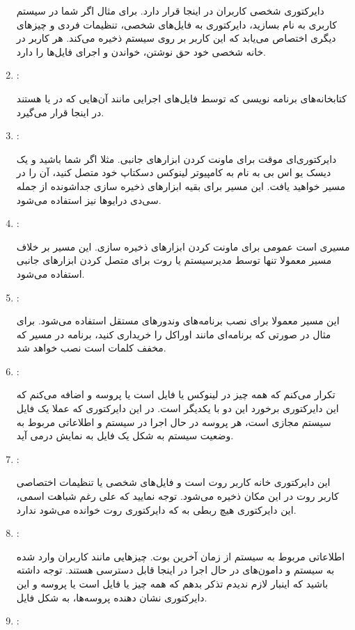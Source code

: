 \begin{enumerate}
دایرکتوری شخصی کاربران در اینجا قرار دارد. برای مثال اگر شما در سیستم کاربری به نام 
 بسازید، دایرکتوری 
 به فایل‌های شخصی، تنظیمات فردی و چیزهای دیگری اختصاص می‌یابد که این کاربر بر روی سیستم ذخیره می‌کند. هر کاربر در خانه شخصی خود حق نوشتن، خواندن و اجرای فایل‌ها را دارد.
\item {\large{}}:

کتابخانه‌های برنامه نویسی که توسط فایل‌های اجرایی مانند آن‌هایی که در 
 یا 
 هستند در اینجا قرار می‌گیرد.
\item {\large{}}:

دایرکتوری‌ای موقت برای ماونت کردن ابزارهای جانبی. مثلا اگر شما 
 باشید و یک دیسک یو اس بی به نام 
 به کامپیوتر لینوکس دسکتاپ خود متصل کنید، آن را در مسیر 
 خواهید یافت. این مسیر برای بقیه ابزارهای ذخیره سازی جداشونده از جمله سی‌دی درایوها نیز استفاده می‌شود.
\item {\large{}}:

مسیری است عمومی برای ماونت کردن ابزارهای ذخیره سازی. این مسیر بر خلاف مسیر 
 معمولا تنها توسط مدیرسیستم یا روت برای متصل کردن ابزارهای جانبی استفاده می‌شود.
\item {\large{}}:

این مسیر معمولا برای نصب برنامه‌های وندورهای مستقل استفاده می‌شود. برای مثال در صورتی که برنامه‌ای مانند اوراکل را خریداری کنید، برنامه در مسیر 
 که مخفف کلمات 
 است نصب خواهد شد.
\item {\large{}}:

تکرار می‌کنم که همه چیز در لینوکس یا فایل است یا پروسه و اضافه می‌کنم که این دایرکتوری برخورد این دو با یکدیگر است. در این دایرکتوری که عملا یک فایل سیستم مجازی است، هر پروسه در حال اجرا در سیستم و اطلاعاتی مربوط به وضعیت سیستم به شکل یک فایل به نمایش درمی آید.
\item {\large{}}:

این دایرکتوری خانه کاربر روت است و فایل‌های شخصی یا تنظیمات اختصاصی کاربر روت در این مکان ذخیره می‌شود. توجه نمایید که علی رغم شباهت اسمی، این دایرکتوری هیچ ربطی به
\lr{/}
 که دایرکتوری روت خوانده می‌شود ندارد.
\item {\large{}}:

اطلاعاتی مربوط به سیستم از زمان آخرین بوت. چیزهایی مانند کاربران وارد شده به سیستم و دامون‌های در حال اجرا در اینجا قابل دسترسی هستند. توجه داشته باشید که اینبار لازم ندیدم تذکر بدهم که همه چیز یا فایل است یا پروسه و این دایرکتوری نشان دهنده پروسه‌ها، به شکل فایل.
\item {\large{}}:


\end{enumerate}
